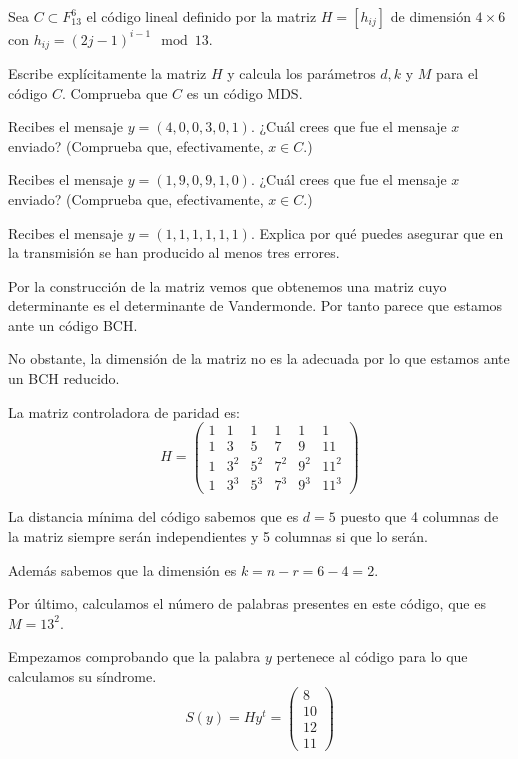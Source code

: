 \begin{problem}[13]
Sea $ C\subset F_{13}^6$ el código lineal definido por
la matriz $H=[h_{ij}]$ de dimensión $4\times6$ con
$h_{ij}=(2j-1)^{i-1} \mod 13$.

\ppart  Escribe explícitamente la matriz $H$ y calcula los parámetros
$d, k$ y $M$ para el código $  C$. Comprueba que $ C$ es un código
MDS.

\ppart Recibes el mensaje $y=(4,0,0,3,0,1)$. ¿Cuál crees que fue el
mensaje $x$ enviado? (Comprueba que, efectivamente, $x\in  C$.)

\ppart Recibes el mensaje $y=(1,9,0,9,1,0)$. ¿Cuál crees que fue el
mensaje $x$ enviado? (Comprueba que, efectivamente, $x\in C$.)

\ppart Recibes el mensaje $y=(1,1,1,1,1,1)$. Explica por qué puedes
asegurar que en la transmisión se han producido al menos tres
errores.

\solution

\spart

Por la construcción de la matriz vemos que obtenemos una matriz cuyo determinante es el determinante de Vandermonde. Por tanto parece que estamos ante un código BCH.

No obstante, la dimensión de la matriz no es la adecuada por lo que estamos ante un BCH reducido.

La matriz controladora de paridad es:
\[H=\left(\begin{array}{cccccc}
1 & 1 & 1 & 1 & 1 & 1 \\
1 & 3 & 5 & 7 & 9 & 11 \\
1 & 3^2 & 5^2 & 7^2 & 9^2 & 11^2 \\
1 & 3^3 & 5^3 & 7^3 & 9^3 & 11^3
\end{array} \right)\]

La distancia mínima del código sabemos que es $d=5$ puesto que 4 columnas de la matriz siempre serán independientes y 5 columnas si que lo serán.

Además sabemos que la dimensión es $k=n-r=6-4=2$.

Por último, calculamos el número de palabras presentes en este código, que es $M=13^2$.

\spart

Empezamos comprobando que la palabra $y$ pertenece al código para lo que calculamos su síndrome.
\[S(y)=Hy^t=\left( \begin{array}{c}8 \\ 10 \\ 12 \\ 11 \end{array}\right)\]


\end{problem}
